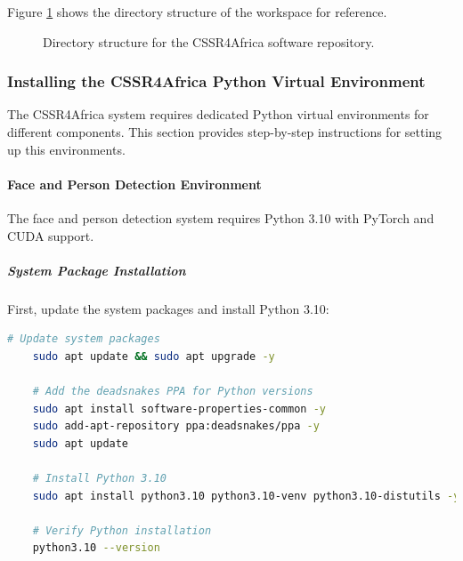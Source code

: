 \documentclass{CSSRforAfrica}
\begin{document}
{Figure \ref{fig:pepper-robot-workspace-directory} shows the directory structure of the workspace for reference.
\begin{figure}[ht]

{\small 
{}
}

\caption{Directory structure for the CSSR4Africa software repository.}
\label{fig:pepper-robot-workspace-directory}
\end{figure}

\subsubsection{Installing the CSSR4Africa Python Virtual Environment}
The CSSR4Africa system requires dedicated Python virtual environments for different components. This section provides step-by-step instructions for setting up this environments.

\paragraph{Face and Person Detection Environment}
The face and person detection system requires Python 3.10 with PyTorch and CUDA support.

\newpage
\subparagraph{System Package Installation}
First, update the system packages and install Python 3.10:
\begin{lstlisting}[style=withoutNumbering, language=bash]
	# Update system packages
	sudo apt update && sudo apt upgrade -y
	
	# Add the deadsnakes PPA for Python versions
	sudo apt install software-properties-common -y
	sudo add-apt-repository ppa:deadsnakes/ppa -y
	sudo apt update
	
	# Install Python 3.10
	sudo apt install python3.10 python3.10-venv python3.10-distutils -y
	
	# Verify Python installation
	python3.10 --version
\end{lstlisting}

}
\end{document}
